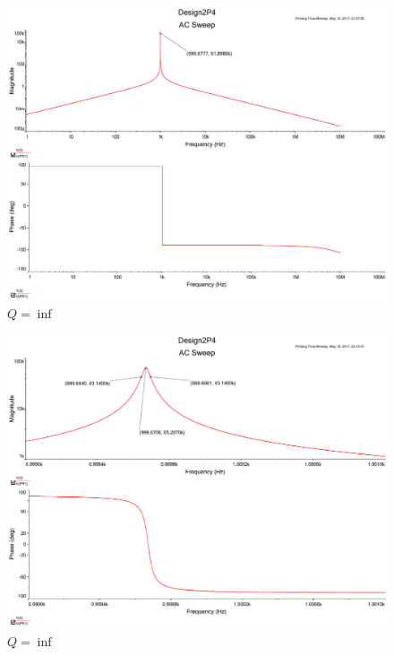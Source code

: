 \documentclass[UTF8,a4paper]{paper}
\begin{document}
\begin{figure}
\centering
\includegraphics[width=\textwidth]{2Pinf.pdf}
\caption{$Q=\inf$}
\label{PQinf}
\end{figure}
\begin{figure}
\centering
\includegraphics[width=\textwidth]{2Pinf_1.pdf}
\caption{$Q=\inf$}
\label{PQinf1}
\end{figure}
\end{document}
